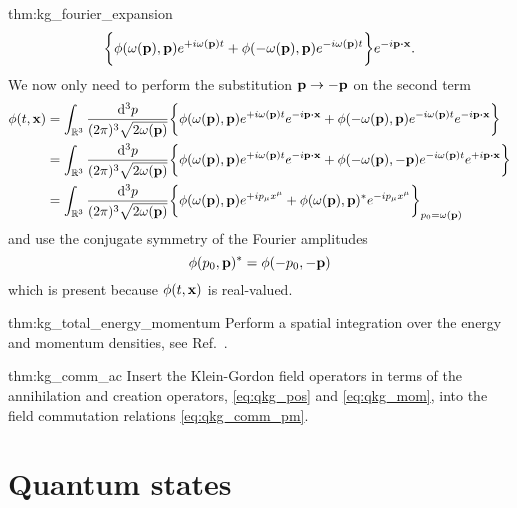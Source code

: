 \begin{delayedproof}{thm:kg_fourier_expansion}
\begin{equation*}
		\biggl\{
			\phi(\omega(\vb{p}),\vb{p})
			e^{+i\omega(\vb{p})t}
			+
			\phi(-\omega(\vb{p}),\vb{p})
			e^{-i\omega(\vb{p})t}
		\biggr\}
		e^{-i\vb{p}\vdot\vb{x}}
		.
	\end{equation*}
	We now only need to perform the substitution $\vb{p}\to-\vb{p}$ on the second term
	\begin{equation*}
		\begin{split}
			\phi(t,\vb{x})
			&=
			\int_{\mathbb{R}^3}\frac{\dd[3]{p}}{(2\pi)^3\sqrt{2\omega(\vb{p})}}
			\biggl\{
				\phi(\omega(\vb{p}),\vb{p})
				e^{+i\omega(\vb{p})t}
				e^{-i\vb{p}\vdot\vb{x}}
				+
				\phi(-\omega(\vb{p}),\vb{p})
				e^{-i\omega(\vb{p})t}
				e^{-i\vb{p}\vdot\vb{x}}
			\biggr\}
			\\
			&=
			\int_{\mathbb{R}^3}\frac{\dd[3]{p}}{(2\pi)^3\sqrt{2\omega(\vb{p})}}
			\biggl\{
				\phi(\omega(\vb{p}),\vb{p})
				e^{+i\omega(\vb{p})t}
				e^{-i\vb{p}\vdot\vb{x}}
				+
				\phi(-\omega(\vb{p}),-\vb{p})
				e^{-i\omega(\vb{p})t}
				e^{+i\vb{p}\vdot\vb{x}}
			\biggr\}
			\\
			&=
			\int_{\mathbb{R}^3}\frac{\dd[3]{p}}{(2\pi)^3\sqrt{2\omega(\vb{p})}}
			\biggl\{
				\phi(\omega(\vb{p}),\vb{p})
				e^{+ip_\mu x^\mu}
				+
				\phi(\omega(\vb{p}),\vb{p})^*
				e^{-ip_\mu x^\mu}
			\biggr\}_{p_0=\omega(\vb{p})}
		\end{split}
	\end{equation*}
	and use the conjugate symmetry of the Fourier amplitudes
	\begin{equation*}
		\phi(p_0,\vb{p})^*
		=
		\phi(-p_0,-\vb{p})
	\end{equation*}
	which is present because $\phi(t,\vb{x})$ is real-valued.
\end{delayedproof}
\begin{delayedproof}{thm:kg_total_energy_momentum}
	Perform a spatial integration over the energy and momentum densities, see Ref.~\cite{Peskin1995}.
\end{delayedproof}
\begin{delayedproof}{thm:kg_comm_ac}
	Insert the Klein-Gordon field operators in terms of the annihilation and creation operators, \cref{eq:qkg_pos} and \cref{eq:qkg_mom}, into the field commutation relations \cref{eq:qkg_comm_pm}.
\end{delayedproof}

\section{Quantum states}

